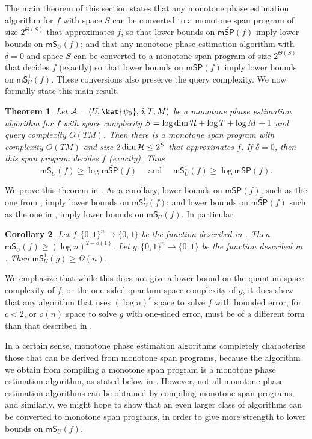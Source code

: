 \documentclass[11pt]{article}
\numberwithin{equation}{section}
\newtheorem{theorem}{Theorem}[section]
\newtheorem{corollary}[theorem]{Corollary}
\theoremstyle{definition}
\theoremstyle{plain}
\begin{document}
The main theorem of this section states that any monotone phase estimation algorithm for $f$ with space $S$ can be converted to a monotone span program of size $2^{\Theta(S)}$ that approximates $f$, so that lower bounds on $\mathsf{m}\widetilde{\mathsf{SP}}(f)$ imply lower bounds on $\mathsf{mS}_U(f)$; and that any monotone phase estimation algorithm with $\delta=0$ and space $S$ can be converted to a monotone span program of size $2^{\Theta(S)}$ that decides $f$ (exactly) so that lower bounds on $\mathsf{mSP}(f)$ imply lower bounds on $\mathsf{mS}_U^1(f)$. These conversions also preserve the query complexity. We now formally state this main result.

\begin{theorem}\label{thm:monotone-alg-to-span}
Let ${\cal A}=(U,\ket{\psi_0},\delta,T,M)$ be a monotone phase estimation algorithm for $f$ with space complexity $S=\log\dim {\cal H}+\log T+\log M+1$ and query complexity $O(TM)$. Then there is a monotone span program with complexity $O(TM)$ and size $2\dim{\cal H}\leq 2^{S}$ that approximates $f$. If $\delta=0$, then this span program decides $f$ (exactly). Thus
$$\mathsf{mS}_U(f)\geq \log \mathsf{m}\widetilde{\mathsf{SP}}(f)\quad\mbox{ and }\quad
\mathsf{mS}_U^1(f) \geq\log \mathsf{mSP}(f) .$$
\end{theorem}
We prove this theorem in . As a corollary, lower bounds on $\mathsf{mSP}(f)$, such as the one from \cite{PR17}, imply lower bounds on $\mathsf{mS}_U^1(f)$;
and lower bounds on $\mathsf{m}\widetilde{\mathsf{SP}}(f)$ such as the one in , imply lower bounds on $\mathsf{mS}_U(f)$. In particular:
\begin{corollary}\label{cor:explicit-mS}
Let $f:\{0,1\}^n\rightarrow\{0,1\}$ be the function described in . Then $\mathsf{mS}_U(f)\geq (\log n)^{2-o(1)}$.
Let $g:\{0,1\}^n\rightarrow\{0,1\}$ be the function described in . Then $\mathsf{mS}_U^1(g)\geq \Omega(n)$.
\end{corollary}
We emphasize that while this does not give a lower bound on the quantum space complexity of $f$, or the one-sided quantum space complexity of $g$, it does show that any algorithm that uses $(\log n)^{c}$ space to solve $f$ with bounded error, for $c<2$, or $o(n)$ space to solve $g$ with one-sided error, must be of a different form than that described in . 


In a certain sense, monotone phase estimation algorithms completely characterize those that can be derived from monotone span programs, because the algorithm we obtain from compiling a monotone span program is a monotone phase estimation algorithm, as stated below in . However, not all monotone phase estimation algorithms can be obtained by compiling monotone span programs, and similarly, we might hope to show that an even larger class of algorithms can be converted to monotone span programs, in order to give more strength to lower bounds on $\mathsf{mS}_U(f)$.
\end{document}
